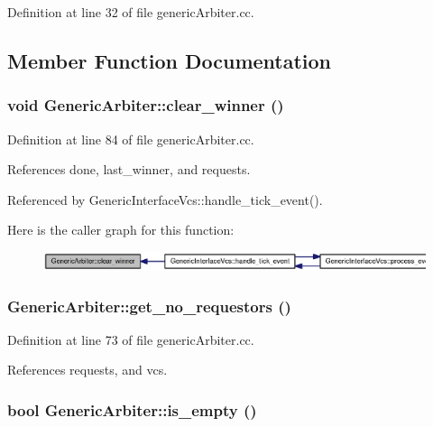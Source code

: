 Definition at line 32 of file genericArbiter.cc.

\subsection{Member Function Documentation}
\subsubsection[{clear\_\-winner}]{\setlength{\rightskip}{0pt plus 5cm}void GenericArbiter::clear\_\-winner ()}\label{classGenericArbiter_137758be6498b8dc717cf4d4c8bc56be}




Definition at line 84 of file genericArbiter.cc.

References done, last\_\-winner, and requests.

Referenced by GenericInterfaceVcs::handle\_\-tick\_\-event().

Here is the caller graph for this function:\nopagebreak
\begin{figure}[H]
\begin{center}
\leavevmode
\includegraphics[width=420pt]{classGenericArbiter_137758be6498b8dc717cf4d4c8bc56be_icgraph}
\end{center}
\end{figure}
\subsubsection[{get\_\-no\_\-requestors}]{ GenericArbiter::get\_\-no\_\-requestors ()}\label{classGenericArbiter_8c0d21bfde4ea6968d2a5d404215dd65}




Definition at line 73 of file genericArbiter.cc.

References requests, and vcs.
\subsubsection[{is\_\-empty}]{\setlength{\rightskip}{0pt plus 5cm}bool GenericArbiter::is\_\-empty ()}\label{classGenericArbiter_334fbdb8fc6071936b0d05a5778cc714}




